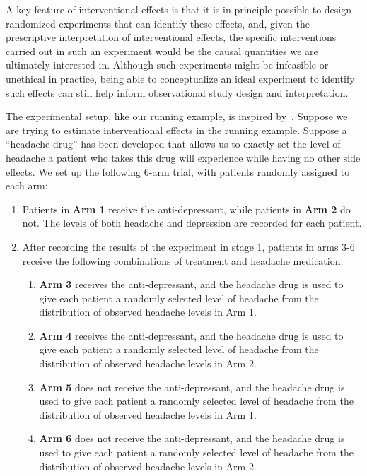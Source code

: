 A key feature of interventional effects is that it is in principle possible to 
design randomized experiments that can identify these effects, and, 
given the prescriptive interpretation of interventional effects, the specific interventions carried out in such an 
experiment would be the causal quantities we are ultimately interested in. Although such experiments might be infeasible 
or unethical in practice, being able to conceptualize an ideal experiment to identify such effects can still
help inform observational study design and interpretation. 

The experimental setup, like our running example, is inspired by~\cite{morenobetancur2018}. Suppose we 
are trying to estimate interventional effects in the running example. Suppose a ``headache drug'' has been developed 
that allows us to exactly set the level of headache a patient who takes this drug will experience while having no
other side effects. We set up the following 6-arm trial, with patients randomly assigned to each arm: 

\begin{experiment}\label{exp:one_mediator}
\indent 
\begin{enumerate}[noitemsep,topsep=0pt]
	\item Patients in \textbf{Arm 1} receive the anti-depressant, while patients in \textbf{Arm 2} do not. 
	The levels of both headache and depression are recorded for each patient.
	\item After recording the results of the experiment in stage 1, patients in arms 3-6 receive the following
	combinations of treatment and headache medication: 
	\begin{enumerate}[noitemsep,topsep=0pt]
		\item \textbf{Arm 3} receives the anti-depressant, and the headache drug is used to give each patient 
		a randomly selected level of headache from the distribution of observed headache levels in Arm 1. 
		\item \textbf{Arm 4} receives the anti-depressant, and the headache drug is used to give each patient 
		a randomly selected level of headache from the distribution of observed headache levels in Arm 2. 
		\item \textbf{Arm 5} does not receive the anti-depressant, and the headache drug is used to give each patient 
		a randomly selected level of headache from the distribution of observed headache levels in Arm 1. 
		\item \textbf{Arm 6} does not receive the anti-depressant, and the headache drug is used to give each patient 
		a randomly selected level of headache from the distribution of observed headache levels in Arm 2. 
	\end{enumerate}
\end{enumerate}
\end{experiment}

